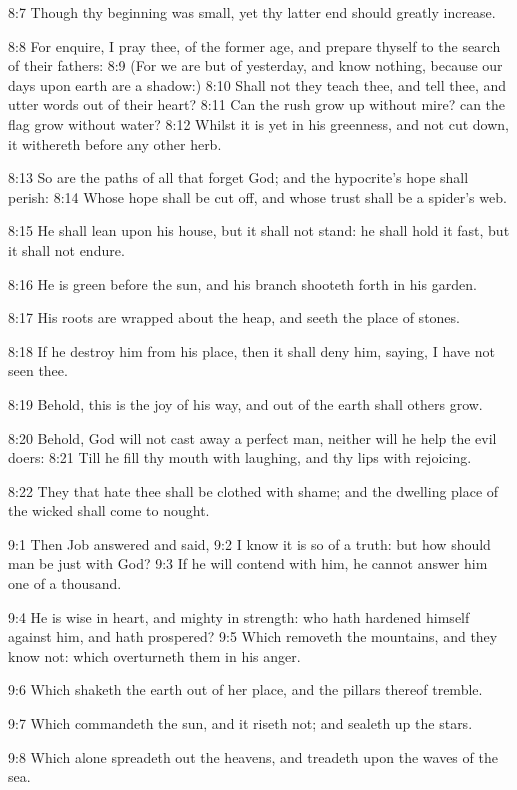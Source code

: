 8:7 Though thy beginning was small, yet thy latter end should greatly
increase.

8:8 For enquire, I pray thee, of the former age, and prepare thyself
to the search of their fathers: 8:9 (For we are but of yesterday, and
know nothing, because our days upon earth are a shadow:) 8:10 Shall
not they teach thee, and tell thee, and utter words out of their
heart?  8:11 Can the rush grow up without mire? can the flag grow
without water?  8:12 Whilst it is yet in his greenness, and not cut
down, it withereth before any other herb.

8:13 So are the paths of all that forget God; and the hypocrite's hope
shall perish: 8:14 Whose hope shall be cut off, and whose trust shall
be a spider's web.

8:15 He shall lean upon his house, but it shall not stand: he shall
hold it fast, but it shall not endure.

8:16 He is green before the sun, and his branch shooteth forth in his
garden.

8:17 His roots are wrapped about the heap, and seeth the place of
stones.

8:18 If he destroy him from his place, then it shall deny him, saying,
I have not seen thee.

8:19 Behold, this is the joy of his way, and out of the earth shall
others grow.

8:20 Behold, God will not cast away a perfect man, neither will he
help the evil doers: 8:21 Till he fill thy mouth with laughing, and
thy lips with rejoicing.

8:22 They that hate thee shall be clothed with shame; and the dwelling
place of the wicked shall come to nought.

9:1 Then Job answered and said, 9:2 I know it is so of a truth: but
how should man be just with God?  9:3 If he will contend with him, he
cannot answer him one of a thousand.

9:4 He is wise in heart, and mighty in strength: who hath hardened
himself against him, and hath prospered?  9:5 Which removeth the
mountains, and they know not: which overturneth them in his anger.

9:6 Which shaketh the earth out of her place, and the pillars thereof
tremble.

9:7 Which commandeth the sun, and it riseth not; and sealeth up the
stars.

9:8 Which alone spreadeth out the heavens, and treadeth upon the waves
of the sea.

